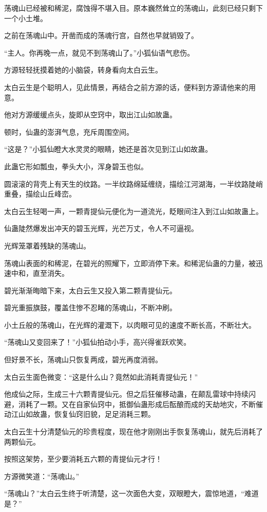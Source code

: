 \begin{this_body}
荡魂山已经被和稀泥，腐蚀得不堪入目。原本巍然耸立的荡魂山，此刻已经只剩下一个小土堆。

之前在荡魂山中。开凿而成的荡魂行宫，自然也早就销毁了。

“主人。你再晚一点，就见不到荡魂山了。”小狐仙语气悲伤。

方源轻轻抚摸着她的小脑袋，转身看向太白云生。

太白云生是个聪明人，见此情景，再结合之前方源的话，便料到方源请他来的用意。

他对方源缓缓点头，旋即从空窍中，取出江山如故蛊。

顿时，仙蛊的澎湃气息，充斥周围空间。

“这是？”小狐仙瞪大水灵灵的眼睛，她还是首次见到江山如故蛊。

此蛊它形如瓢虫，拳头大小，浑身碧玉也似。

圆滚滚的背壳上有天生的纹路。一半纹路绵延缠绕，描绘江河湖海，一半纹路陡峭重叠，描绘山丘峰峦。

太白云生轻喝一声，一颗青提仙元便化为一道流光，眨眼间注入到江山如故蛊上。

仙蛊陡然爆发出冲天的碧玉光辉，光芒万丈，令人不可逼视。

光辉笼罩着残缺的荡魂山。

荡魂山表面的和稀泥，在碧光的照耀下，立即消停下来。和稀泥仙蛊的力量，被迅速中和，直至消失。

碧光渐渐晦暗下来，太白云生又投入第二颗青提仙元。

碧光重振旗鼓，覆盖住惨不忍睹的荡魂山，不断冲刷。

小土丘般的荡魂山，在光辉的灌溉下，以肉眼可见的速度不断长高，不断壮大。

“荡魂山又变回来了！”小狐仙拍动小手，高兴得雀跃欢笑。

但好景不长，荡魂山只恢复两成，碧光再度消弱。

太白云生面色微变：“这是什么山？竟然如此消耗青提仙元！”

他成仙之际，生成三十六颗青提仙元。但之后狂催移动蛊，在颠乱雷球中持续闪避，消耗了一颗。又在自家仙窍中，抵御仙蛊形成后酝酿而成的天劫地灾，不断催动江山如故蛊，恢复仙窍旧貌，足足消耗三颗。

太白云生十分清楚仙元的珍贵程度，现在他才刚刚出手恢复荡魂山，就先后消耗了两颗仙元。

按照这架势，至少要消耗五六颗的青提仙元才行！

方源微笑道：“荡魂山。”

“荡魂山？”太白云生终于听清楚，这一次面色大变，双眼瞪大，震惊地道，“难道是？”


\end{this_body}
